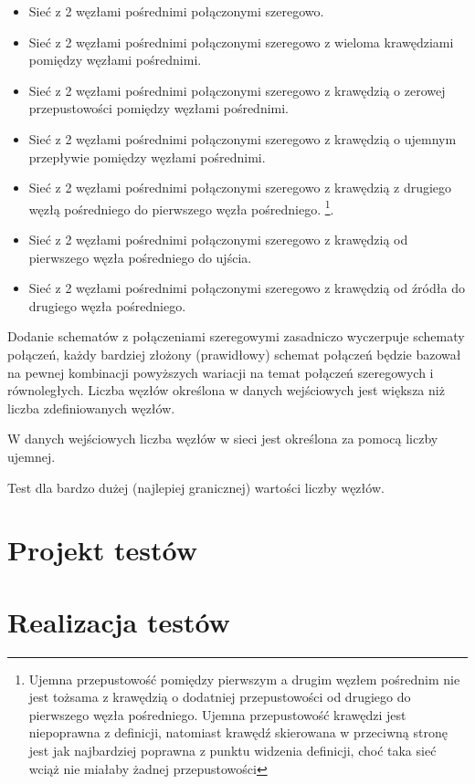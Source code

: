 \documentclass[10pt]{dokument-tiwo}
\begin{document}
\begin{itemize}
    \item Sieć z 2 węzłami pośrednimi połączonymi szeregowo.
    \item Sieć z 2 węzłami pośrednimi połączonymi szeregowo z wieloma krawędziami pomiędzy węzłami pośrednimi.
    \item Sieć z 2 węzłami pośrednimi połączonymi szeregowo z krawędzią o zerowej przepustowości pomiędzy węzłami pośrednimi.
    \item Sieć z 2 węzłami pośrednimi połączonymi szeregowo z krawędzią o ujemnym przepływie pomiędzy węzłami pośrednimi.
    \item Sieć z 2 węzłami pośrednimi połączonymi szeregowo z krawędzią z drugiego węzłą pośredniego do pierwszego węzła pośredniego.
\footnote{Ujemna przepustowość pomiędzy pierwszym a drugim węzłem pośrednim nie jest tożsama z krawędzią o dodatniej przepustowości od drugiego do pierwszego węzła pośredniego. Ujemna przepustowość krawędzi jest niepoprawna z definicji, natomiast krawędź skierowana w przeciwną stronę jest jak najbardziej poprawna z punktu widzenia definicji, choć taka sieć wciąż nie miałaby żadnej przepustowości}.
    \item Sieć z 2 węzłami pośrednimi połączonymi szeregowo z krawędzią od pierwszego węzła pośredniego do ujścia.
    \item Sieć z 2 węzłami pośrednimi połączonymi szeregowo z krawędzią od źródła do drugiego węzła pośredniego.
\end{itemize}
Dodanie schematów z połączeniami szeregowymi zasadniczo wyczerpuje schematy połączeń, każdy bardziej złożony (prawidłowy) schemat połączeń będzie bazował na pewnej kombinacji powyższych wariacji na temat połączeń szeregowych i równoległych.
Liczba węzłów określona w danych wejściowych jest większa niż liczba zdefiniowanych węzłów.

W danych wejściowych liczba węzłów w sieci jest określona za pomocą liczby ujemnej.

Test dla bardzo dużej (najlepiej granicznej) wartości liczby węzłów.

\section{Projekt testów}


\section{Realizacja testów}
\end{document}
